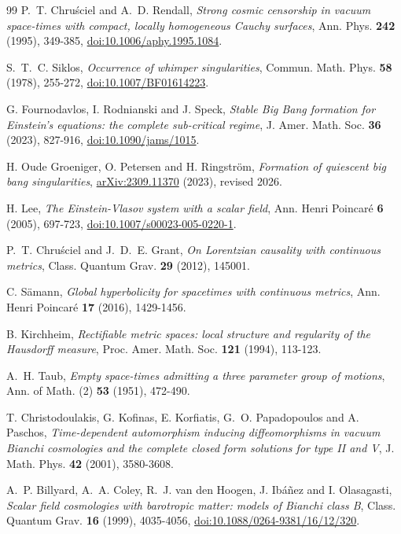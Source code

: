 \documentclass[10pt,a4paper]{article}
\numberwithin{equation}{section}
\theoremstyle{definition}
\theoremstyle{remark}
\begin{document}
\begin{thebibliography}{99}
P.~T. Chru\'sciel and A.~D. Rendall,
\emph{Strong cosmic censorship in vacuum space-times with compact,
locally homogeneous Cauchy surfaces},
Ann. Phys. \textbf{242} (1995), 349-385,
\href{https://doi.org/10.1006/aphy.1995.1084}
{doi:10.1006/aphy.1995.1084}.

S.~T.~C. Siklos,
\emph{Occurrence of whimper singularities},
Commun. Math. Phys. \textbf{58} (1978), 255-272,
\href{https://doi.org/10.1007/BF01614223}
{doi:10.1007/BF01614223}.

G. Fournodavlos, I. Rodnianski and J. Speck,
\emph{Stable Big Bang formation for Einstein's equations:
the complete sub-critical regime},
J. Amer. Math. Soc. \textbf{36} (2023), 827-916,
\href{https://doi.org/10.1090/jams/1015}{doi:10.1090/jams/1015}.

H. Oude Groeniger, O. Petersen and H. Ringstr\"om,
\emph{Formation of quiescent big bang singularities},
\href{https://arxiv.org/abs/2309.11370}{arXiv:2309.11370} (2023),
revised 2026.

H. Lee,
\emph{The Einstein-Vlasov system with a scalar field},
Ann. Henri Poincar\'e \textbf{6} (2005), 697-723,
\href{https://doi.org/10.1007/s00023-005-0220-1}
{doi:10.1007/s00023-005-0220-1}.

P.~T. Chru\'sciel and J.~D.~E. Grant,
\emph{On Lorentzian causality with continuous metrics},
Class. Quantum Grav. \textbf{29} (2012), 145001.

C. S\"amann,
\emph{Global hyperbolicity for spacetimes with continuous metrics},
Ann. Henri Poincar\'e \textbf{17} (2016), 1429-1456.

B. Kirchheim,
\emph{Rectifiable metric spaces: local structure and regularity of the
Hausdorff measure},
Proc. Amer. Math. Soc. \textbf{121} (1994), 113-123.

A.~H. Taub,
\emph{Empty space-times admitting a three parameter group of motions},
Ann. of Math. (2) \textbf{53} (1951), 472-490.

T. Christodoulakis, G. Kofinas, E. Korfiatis, G.~O. Papadopoulos
and A. Paschos,
\emph{Time-dependent automorphism inducing diffeomorphisms in vacuum
Bianchi cosmologies and the complete closed form solutions for type II
and V},
J. Math. Phys. \textbf{42} (2001), 3580-3608.

A.~P. Billyard, A.~A. Coley,
R.~J. van den Hoogen, J. Ib\'a\~nez and I. Olasagasti,
\emph{Scalar field cosmologies with barotropic matter: models of Bianchi
class B},
Class. Quantum Grav. \textbf{16} (1999), 4035-4056,
\href{https://doi.org/10.1088/0264-9381/16/12/320}
{doi:10.1088/0264-9381/16/12/320}.


\end{thebibliography}
\end{document}
